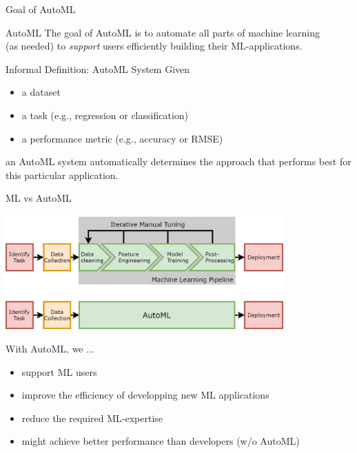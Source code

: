 \begin{frame}[c]{Goal of AutoML}

\begin{block}{AutoML}
The goal of AutoML is to automate all parts of machine learning\\ (as needed)
to \emph{support} users efficiently building their ML-applications.
\end{block}

\bigskip
\pause

\begin{block}{Informal Definition: AutoML System}
Given
\begin{itemize}
  \item a dataset
  \item a task (e.g., regression or classification)
  \item a performance metric (e.g., accuracy or RMSE)
\end{itemize}
an AutoML system automatically determines the approach 
that performs best for this particular application.
\end{block}

\end{frame}
\begin{frame}[c]{ML vs AutoML}

\begin{center}
\includegraphics[width=0.8\textwidth]{images/AutoMLPipeline.jpg}
\end{center}

\bigskip
With AutoML, we ...
\begin{itemize}
	\item support ML users
	\item improve the efficiency of developping new ML applications
	\item reduce the required ML-expertise 
	\item might achieve better performance than developers (w/o AutoML)
\end{itemize}

\end{frame}
